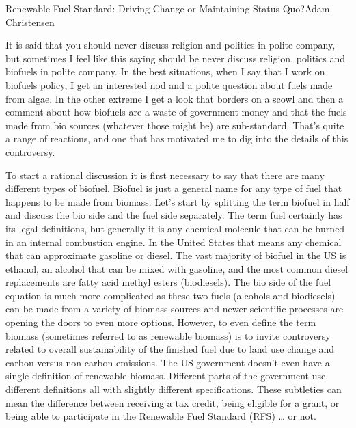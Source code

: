 \documentclass[10pt]{papertex}
\begin{document}
\makeatletter
\renewcommand{\papertex@headDateTime}{
    \raisebox{-5pt}
    {\fontsize{5mm}{6mm}\usefont{T1}{bch}{b}{n}{April 2014}}
    }
\makeatother

\begin{news}{2}{Renewable Fuel Standard: Driving Change or Maintaining Status 
    Quo?}{Adam Christensen}{}{}

It is said that you should never discuss religion and politics in polite 
company, but sometimes I feel like this saying should be never discuss 
religion, politics and biofuels in polite company. In the best situations, 
when I say that I work on biofuels policy, I get an interested nod and a 
polite question about fuels made from algae. In the other extreme I get a 
look that borders on a scowl and then a comment about how biofuels are a 
waste of government money and that the fuels made from bio sources (whatever 
those might be) are sub-standard. That’s quite a range of reactions, and one 
that has motivated me to dig into the details of this controversy.

To start a rational discussion it is first necessary to say that there are many 
different types of biofuel. Biofuel is just a general name for any type of fuel 
that happens to be made from biomass. Let’s start by splitting the term biofuel 
in half and discuss the bio side and the fuel side separately. The term fuel 
certainly has its legal definitions, but generally it is any chemical molecule 
that can be burned in an internal combustion engine. In the United States that 
means any chemical that can approximate gasoline or diesel. The vast majority 
of biofuel in the US is ethanol, an alcohol that can be mixed with gasoline, 
and the most common diesel replacements are fatty acid methyl esters 
(biodiesels). The bio side of the fuel equation is much more complicated as 
these two fuels (alcohols and biodiesels) can be made from a variety of biomass 
sources and newer scientific processes are opening the doors to even more 
options. However, to even define the term biomass (sometimes referred to as 
renewable biomass) is to invite controversy related to overall sustainability 
of the finished fuel due to land use change and carbon versus non-carbon 
emissions. The US government doesn’t even have a single definition of 
renewable biomass. Different parts of the government use different definitions 
all with slightly different specifications. These subtleties can mean the 
difference between receiving a tax credit, being eligible for a grant, or 
being able to participate in the Renewable Fuel Standard (RFS) … or not.


\end{news}
\end{document}
